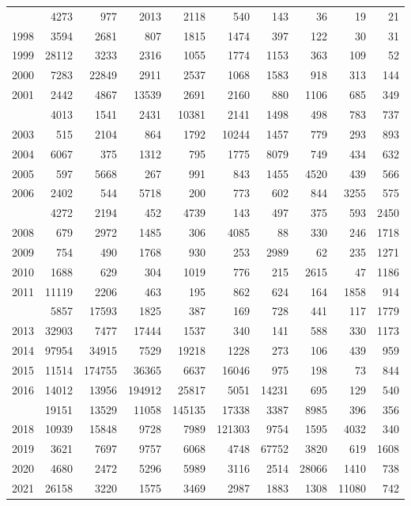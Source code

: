 \documentclass[
]{article}
\begin{document}
\begin{longtable}[t]{lrrrrrrrrr}
\addlinespace
1997 & 4273 & 977 & 2013 & 2118 & 540 & 143 & 36 & 19 & 21\\
1998 & 3594 & 2681 & 807 & 1815 & 1474 & 397 & 122 & 30 & 31\\
1999 & 28112 & 3233 & 2316 & 1055 & 1774 & 1153 & 363 & 109 & 52\\
2000 & 7283 & 22849 & 2911 & 2537 & 1068 & 1583 & 918 & 313 & 144\\
2001 & 2442 & 4867 & 13539 & 2691 & 2160 & 880 & 1106 & 685 & 349\\
\addlinespace
2002 & 4013 & 1541 & 2431 & 10381 & 2141 & 1498 & 498 & 783 & 737\\
2003 & 515 & 2104 & 864 & 1792 & 10244 & 1457 & 779 & 293 & 893\\
2004 & 6067 & 375 & 1312 & 795 & 1775 & 8079 & 749 & 434 & 632\\
2005 & 597 & 5668 & 267 & 991 & 843 & 1455 & 4520 & 439 & 566\\
2006 & 2402 & 544 & 5718 & 200 & 773 & 602 & 844 & 3255 & 575\\
\addlinespace
2007 & 4272 & 2194 & 452 & 4739 & 143 & 497 & 375 & 593 & 2450\\
2008 & 679 & 2972 & 1485 & 306 & 4085 & 88 & 330 & 246 & 1718\\
2009 & 754 & 490 & 1768 & 930 & 253 & 2989 & 62 & 235 & 1271\\
2010 & 1688 & 629 & 304 & 1019 & 776 & 215 & 2615 & 47 & 1186\\
2011 & 11119 & 2206 & 463 & 195 & 862 & 624 & 164 & 1858 & 914\\
\addlinespace
2012 & 5857 & 17593 & 1825 & 387 & 169 & 728 & 441 & 117 & 1779\\
2013 & 32903 & 7477 & 17444 & 1537 & 340 & 141 & 588 & 330 & 1173\\
2014 & 97954 & 34915 & 7529 & 19218 & 1228 & 273 & 106 & 439 & 959\\
2015 & 11514 & 174755 & 36365 & 6637 & 16046 & 975 & 198 & 73 & 844\\
2016 & 14012 & 13956 & 194912 & 25817 & 5051 & 14231 & 695 & 129 & 540\\
\addlinespace
2017 & 19151 & 13529 & 11058 & 145135 & 17338 & 3387 & 8985 & 396 & 356\\
2018 & 10939 & 15848 & 9728 & 7989 & 121303 & 9754 & 1595 & 4032 & 340\\
2019 & 3621 & 7697 & 9757 & 6068 & 4748 & 67752 & 3820 & 619 & 1608\\
2020 & 4680 & 2472 & 5296 & 5989 & 3116 & 2514 & 28066 & 1410 & 738\\
2021 & 26158 & 3220 & 1575 & 3469 & 2987 & 1883 & 1308 & 11080 & 742\\*
\end{longtable}
\end{document}
